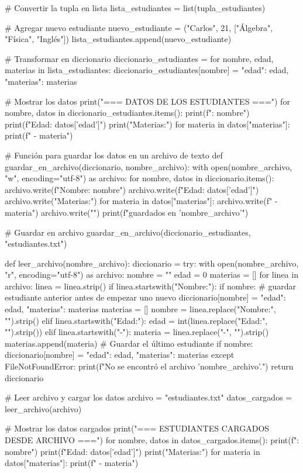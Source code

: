 # Convertir la tupla en lista
lista_estudiantes = list(tupla_estudiantes)

# Agregar nuevo estudiante
nuevo_estudiante = ("Carlos", 21, ["Álgebra", "Física", "Inglés"])
lista_estudiantes.append(nuevo_estudiante)

# Transformar en diccionario
diccionario_estudiantes = {}
for nombre, edad, materias in lista_estudiantes:
    diccionario_estudiantes[nombre] = {
        "edad": edad,
        "materias": materias
    }

# Mostrar los datos
print("=== DATOS DE LOS ESTUDIANTES ===")
for nombre, datos in diccionario_estudiantes.items():
    print(f"\nNombre: {nombre}")
    print(f"Edad: {datos['edad']}")
    print("Materias:")
    for materia in datos["materias"]:
        print(f" - {materia}")

# Función para guardar los datos en un archivo de texto
def guardar_en_archivo(diccionario, nombre_archivo):
    with open(nombre_archivo, "w", encoding="utf-8") as archivo:
        for nombre, datos in diccionario.items():
            archivo.write(f"Nombre: {nombre}\n")
            archivo.write(f"Edad: {datos['edad']}\n")
            archivo.write("Materias:\n")
            for materia in datos["materias"]:
                archivo.write(f" - {materia}\n")
            archivo.write("\n")
    print(f"\nDatos guardados en '{nombre_archivo}'")

# Guardar en archivo
guardar_en_archivo(diccionario_estudiantes, "estudiantes.txt")

def leer_archivo(nombre_archivo):
    diccionario = {}
    try:
        with open(nombre_archivo, "r", encoding="utf-8") as archivo:
            nombre = ""
            edad = 0
            materias = []
            for linea in archivo:
                linea = linea.strip()
                if linea.startswith("Nombre:"):
                    if nombre:  # guardar estudiante anterior antes de empezar uno nuevo
                        diccionario[nombre] = {
                            "edad": edad,
                            "materias": materias
                        }
                        materias = []
                    nombre = linea.replace("Nombre:", "").strip()
                elif linea.startswith("Edad:"):
                    edad = int(linea.replace("Edad:", "").strip())
                elif linea.startswith("-"):
                    materia = linea.replace("-", "").strip()
                    materias.append(materia)
            # Guardar el último estudiante
            if nombre:
                diccionario[nombre] = {
                    "edad": edad,
                    "materias": materias
                }
    except FileNotFoundError:
        print(f"No se encontró el archivo '{nombre_archivo}'.")
    return diccionario

    # Leer archivo y cargar los datos
archivo = "estudiantes.txt"
datos_cargados = leer_archivo(archivo)

# Mostrar los datos cargados
print("\n=== ESTUDIANTES CARGADOS DESDE ARCHIVO ===")
for nombre, datos in datos_cargados.items():
    print(f"\nNombre: {nombre}")
    print(f"Edad: {datos['edad']}")
    print("Materias:")
    for materia in datos["materias"]:
        print(f" - {materia}")
